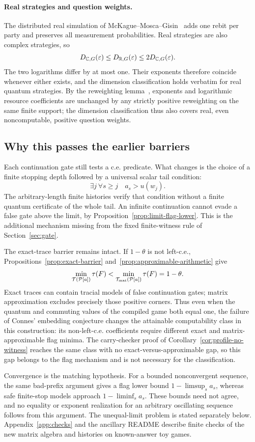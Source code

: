 \paragraph{Real strategies and question weights.}
The distributed real simulation of McKague--Mosca--Gisin~\cite[Section~II.C]{MMG09} adds one rebit per party and preserves all measurement probabilities. Real strategies are also complex strategies, so
\[
 D_{\mathbb C,G}(\varepsilon)\le D_{\mathbb R,G}(\varepsilon)
 \le2D_{\mathbb C,G}(\varepsilon).
\]
The two logarithms differ by at most one. Their exponents therefore coincide whenever either exists, and the dimension classification holds verbatim for real quantum strategies. By the reweighting lemma~\cite[Lemma~11.12, Section~11.6]{DM-precision}, exponents and logarithmic resource coefficients are unchanged by any strictly positive reweighting on the same finite support; the dimension classification thus also covers real, even noncomputable, positive question weights.

\subsection{Why this passes the earlier barriers}\label{sec:classification-barriers}
Each continuation gate still tests a c.e. predicate. What changes is the choice of a finite stopping depth followed by a universal scalar tail condition:
\[
 \exists j\ \forall s\ge j\quad a_s>u(w_j).
\]
The arbitrary-length finite histories verify that condition without a finite quantum certificate of the whole tail. An infinite continuation cannot evade a false gate above the limit, by Proposition~\ref{prop:limit-flag-lower}. This is the additional mechanism missing from the fixed finite-witness rule of Section~\ref{sec:gate}.

The exact-trace barrier remains intact. If $1-\theta$ is not left-c.e., Propositions~\ref{prop:exact-barrier} and~\ref{prop:approximable-arithmetic} give
\[
 \min_{\mathcal T(\mathcal P[a])}\tau(F)
 <\min_{\mathcal T_{\rm mat}(\mathcal P[a])}\tau(F)=1-\theta.
\]
Exact traces can contain tracial models of false continuation gates; matrix approximation excludes precisely those positive corners. Thus even when the quantum and commuting values of the compiled game both equal one, the failure of Connes' embedding conjecture changes the attainable computability class in this construction: its non-left-c.e. coefficients require different exact and matrix-approximable flag minima. The carry-checker proof of Corollary~\ref{cor:profile-no-witness} reaches the same class with no exact-versus-approximable gap, so this gap belongs to the flag mechanism and is not necessary for the classification.

Convergence is the matching hypothesis. For a bounded nonconvergent sequence, the same bad-prefix argument gives a flag lower bound $1-\limsup_s a_s$, whereas safe finite-stop models approach $1-\liminf_s a_s$. These bounds need not agree, and no equality or exponent realization for an arbitrary oscillating sequence follows from this argument. The unequal-limit problem is stated separately below. Appendix~\ref{app:checks} and the ancillary README describe finite checks of the new matrix algebra and histories on known-answer toy games.
